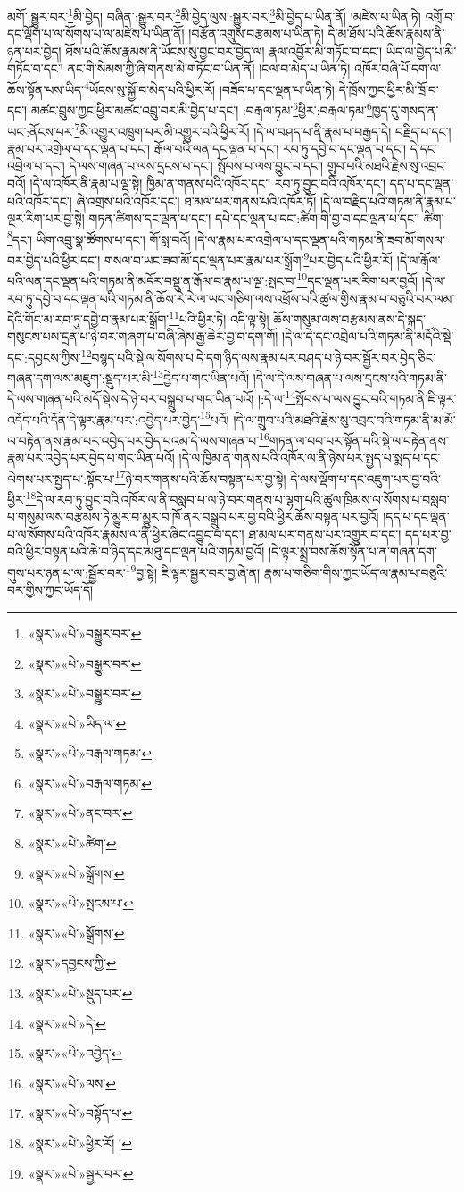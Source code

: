 མགོ་:སྒྱུར་བར་\footnote{«སྣར་»«པེ་»བསྒྱུར་བར་}མི་བྱེད། བཞིན་:སྒྱུར་བར་\footnote{«སྣར་»«པེ་»བསྒྱུར་བར་}མི་བྱེད་ལུས་:སྒྱུར་བར་\footnote{«སྣར་»«པེ་»བསྒྱུར་བར་}མི་བྱེད་པ་ཡིན་ནོ། །མཛེས་པ་ཡིན་ཏེ། འགྲོ་བ་དང་ལྡོག་པ་ལ་སོགས་པ་ལ་མཛེས་པ་ཡིན་ནོ། །བརྩོན་འགྲུས་བརྩམས་པ་ཡིན་ཏེ། དེ་མ་ཐོས་པའི་ཆོས་རྣམས་ནི་ཉན་པར་བྱེད། ཐོས་པའི་ཆོས་རྣམས་ནི་ཡོངས་སུ་བྱང་བར་བྱེད་ལ། རྣལ་འབྱོར་མི་གཏོང་བ་དང་། ཡིད་ལ་བྱེད་པ་མི་གཏོང་བ་དང་། ནང་གི་སེམས་ཀྱི་ཞི་གནས་མི་གཏོང་བ་ཡིན་ནོ། །ངལ་བ་མེད་པ་ཡིན་ཏེ། འཁོར་བཞི་པོ་དག་ལ་ཆོས་སྟོན་པས་ཡིད་\footnote{«སྣར་»«པེ་»ཡིད་ལ་}ཡོངས་སུ་སྐྱོ་བ་མེད་པའི་ཕྱིར་རོ། །བཟོད་པ་དང་ལྡན་པ་ཡིན་ཏེ། དེ་ཁྲོས་ཀྱང་ཕྱིར་མི་ཁྲོ་བ་དང་། མཚང་བྲུས་ཀྱང་ཕྱིར་མཚང་འབྲུ་བར་མི་བྱེད་པ་དང་། :བརྒལ་ཏམ་\footnote{«སྣར་»«པེ་»བརྒལ་གཏམ་}ཕྱིར་:བརྒལ་ཏམ་\footnote{«སྣར་»«པེ་»བརྒལ་གཏམ་}ཁྱད་དུ་གསད་ན་ཡང་:ནོངས་པར་\footnote{«སྣར་»«པེ་»ནང་བར་}མི་འགྱུར་འཁྲུག་པར་མི་འགྱུར་བའི་ཕྱིར་རོ། །དེ་ལ་བཤད་པ་ནི་རྣམ་པ་བརྒྱད་དེ། བརྗིད་པ་དང་། རྣམ་པར་འགྲེལ་བ་དང་ལྡན་པ་དང་། རྒོལ་བའི་ལན་དང་ལྡན་པ་དང་། རབ་ཏུ་དབྱེ་བ་དང་ལྡན་པ་དང་། དེ་དང་འབྲེལ་པ་དང་། དེ་ལས་གཞན་པ་ལས་དྲངས་པ་དང་། སྤོབས་པ་ལས་བྱུང་བ་དང་། གྲུབ་པའི་མཐའི་རྗེས་སུ་འབྲང་བའོ། །དེ་ལ་འཁོར་ནི་རྣམ་པ་ལྔ་སྟེ། ཁྱིམ་ན་གནས་པའི་འཁོར་དང་། རབ་ཏུ་བྱུང་བའི་འཁོར་དང་། དད་པ་དང་ལྡན་པའི་འཁོར་དང་། ཞེ་འགྲས་པའི་འཁོར་དང་། ཐ་མལ་པར་གནས་པའི་འཁོར་ཏོ། །དེ་ལ་བརྗིད་པའི་གཏམ་ནི་རྣམ་པ་ལྔར་རིག་པར་བྱ་སྟེ། གཏན་ཚིགས་དང་ལྡན་པ་དང་། དཔེ་དང་ལྡན་པ་དང་:ཚིག་གི་བྱ་བ་དང་ལྡན་པ་དང་། ཚིག་\footnote{«སྣར་»«པེ་»ཚིག་}དང་། ཡིག་འབྲུ་སྣ་ཚོགས་པ་དང་། གོ་སླ་བའོ། །དེ་ལ་རྣམ་པར་འགྲེལ་པ་དང་ལྡན་པའི་གཏམ་ནི་ཟབ་མོ་གསལ་བར་བྱེད་པའི་ཕྱིར་དང་། གསལ་བ་ཡང་ཟབ་མོ་དང་ལྡན་པར་རྣམ་པར་སྒྲོག་\footnote{«སྣར་»«པེ་»སྒྲོགས་}པར་བྱེད་པའི་ཕྱིར་རོ། །དེ་ལ་རྒོལ་པའི་ལན་དང་ལྡན་པའི་གཏམ་ནི་མདོར་བསྡུ་ན་རྒོལ་བ་རྣམ་པ་ལྔ་:སྤང་བ་\footnote{«སྣར་»«པེ་»སྤངས་པ་}དང་ལྡན་པར་རིག་པར་བྱའོ། །དེ་ལ་རབ་ཏུ་དབྱེ་བ་དང་ལྡན་པའི་གཏམ་ནི་ཆོས་རེ་རེ་ལ་ཡང་གཅིག་ལས་འཕྲོས་པའི་ཚུལ་གྱིས་རྣམ་པ་བཅུའི་བར་ལམ་དེའི་གོང་མ་རབ་ཏུ་དབྱེ་བ་རྣམ་པར་སྒྲོག་\footnote{«སྣར་»«པེ་»སྒྲོགས་}པའི་ཕྱིར་ཏེ། འདི་ལྟ་སྟེ། ཆོས་གསུམ་ལས་བརྩམས་ནས་དེ་སྐད་གསུངས་པས་དྲན་པ་ཉེ་བར་གཞག་པ་བཞི་ཞེས་རྒྱ་ཆེར་བྱ་བ་དག་གོ། །དེ་ལ་དེ་དང་འབྲེལ་པའི་གཏམ་ནི་མདོའི་སྡེ་དང་:དབྱངས་ཀྱིས་\footnote{«སྣར་»དབྱངས་ཀྱི་}བསྙད་པའི་སྡེ་ལ་སོགས་པ་དེ་དག་ཉིད་ལས་རྣམ་པར་བཤད་པ་ཉེ་བར་སྦྱོར་བར་བྱེད་ཅིང་གཞན་དག་ལས་མཇུག་:སྡུད་པར་མི་\footnote{«སྣར་»«པེ་»སྡུད་པར་}བྱེད་པ་གང་ཡིན་པའོ། །དེ་ལ་དེ་ལས་གཞན་པ་ལས་དྲངས་པའི་གཏམ་ནི་དེ་ལས་གཞན་པའི་མདོ་སྡེས་དེ་ཉེ་བར་བསྒྲུབ་པ་གང་ཡིན་པའོ། །:དེ་ལ་\footnote{«སྣར་»«པེ་»དེ་}སྤོབས་པ་ལས་བྱུང་བའི་གཏམ་ནི་ཇི་ལྟར་འདོད་པའི་དོན་དེ་ལྟར་རྣམ་པར་:འབྱེད་པར་བྱེད་\footnote{«སྣར་»«པེ་»འབྱེད་}པའོ། །དེ་ལ་གྲུབ་པའི་མཐའི་རྗེས་སུ་འབྲང་བའི་གཏམ་ནི་མ་མོ་ལ་བརྟེན་ནས་རྣམ་པར་འབྱེད་པར་བྱེད་པའམ་དེ་ལས་གཞན་པ་\footnote{«སྣར་»«པེ་»ལས་}གཏན་ལ་བབ་པར་སྟོན་པའི་སྡེ་ལ་བརྟེན་ནས་རྣམ་པར་འབྱེད་པར་བྱེད་པ་གང་ཡིན་པའོ། །དེ་ལ་ཁྱིམ་ན་གནས་པའི་འཁོར་ལ་ནི་ཉེས་པར་སྤྱད་པ་སྨད་པ་དང་ལེགས་པར་སྤྱད་པ་:སྟོང་པ་\footnote{«སྣར་»«པེ་»བསྟོད་པ་}ཉེ་བར་གནས་པའི་ཆོས་བསྟན་པར་བྱ་སྟེ། དེ་ལས་ལྡོག་པ་དང་འཇུག་པར་བྱ་བའི་ཕྱིར་\footnote{«སྣར་»«པེ་»ཕྱིར་རོ། །}དེ་ལ་རབ་ཏུ་བྱུང་བའི་འཁོར་ལ་ནི་བསླབ་པ་ལ་ཉེ་བར་གནས་པ་ལྷག་པའི་ཚུལ་ཁྲིམས་ལ་སོགས་པ་བསླབ་པ་གསུམ་ལས་བརྩམས་ཏེ་མྱུར་བ་མྱུར་བ་ཁོ་ནར་བསྒྲུབ་པར་བྱ་བའི་ཕྱིར་ཆོས་བསྟན་པར་བྱའོ། །དད་པ་དང་ལྡན་པ་ལ་སོགས་པའི་འཁོར་རྣམས་ལ་ནི་ཕྱིར་ཞིང་འབྱུང་བ་དང་། ཐ་མལ་པར་གནས་པར་འགྱུར་བ་དང་། དད་པར་བྱ་བའི་ཕྱིར་བསྟན་པའི་ཆེ་བ་ཉིད་དང་མཐུ་དང་ལྡན་པའི་གཏམ་བྱའོ། །དེ་ལྟར་སྨྲ་བས་ཆོས་སྟོན་པ་ན་གཞན་དག་གུས་པར་ཉན་པ་ལ་:སྦྱོར་བར་\footnote{«སྣར་»«པེ་»སྦྱར་བར་}བྱ་སྟེ། ཇི་ལྟར་སྦྱར་བར་བྱ་ཞེ་ན། རྣམ་པ་གཅིག་གིས་ཀྱང་ཡོད་ལ་རྣམ་པ་བཅུའི་བར་གྱིས་ཀྱང་ཡོད་དོ། 